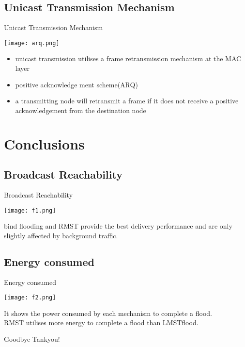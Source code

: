 \documentclass{beamer}
\begin{document}
\subsection{Unicast Transmission Mechanism}

\begin{frame}{Unicast Transmission Mechanism}
\begin{center}
    \texttt{[image: arq.png]}
\end{center}
        \pause
\begin{itemize}
\item unicast transmission utilises a frame retransmission mechanism at the MAC layer
        \pause
\item positive acknowledge ment scheme(ARQ)
        \pause
\item a transmitting node will retransmit a frame if it does not receive a positive acknowledgement from the destination node
\end{itemize}
\end{frame}


\section{Conclusions}
\subsection{Broadcast Reachability}
\begin{frame}{Broadcast Reachability}
    \begin{center}
    \texttt{[image: f1.png]}
    \end{center}
    bind flooding and RMST provide the best delivery performance and are only slightly affected by background traffic.
\end{frame}

\subsection{Energy consumed}
\begin{frame}{Energy consumed}
    \begin{center}
    \texttt{[image: f2.png]}
    \end{center}
    It shows the power consumed by each mechanism to complete a flood.\\
    RMST utilises more energy to complete a flood than LMSTflood.
\end{frame}

\begin{frame}{Goodbye}
    Tankyou!
\end{frame}
\end{document}
